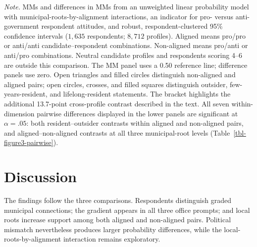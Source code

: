 \documentclass[
  letterpaper,
  DIV=11,
  numbers=noendperiod]{scrartcl}
\newcommand{\criticmarkupadd}[1]{#1}
\newcommand{\criticmarkuprm}[1]{}
\begin{document}
\emph{Note.} MMs and differences in MMs from an unweighted linear
probability model with municipal-roots-by-alignment interactions,
\criticmarkuprm{a}\criticmarkupadd{an indicator for pro- versus
anti-government} respondent \criticmarkuprm{attitude-group
control,}\criticmarkupadd{attitudes,} and robust, respondent-clustered
95\% confidence intervals (\(1{,}635\) respondents; \(8{,}712\)
profiles). Aligned means pro/pro or anti/anti candidate--respondent
combinations. Non-aligned means pro/anti or anti/pro combinations.
Neutral candidate profiles and respondents scoring 4--6 are outside this
comparison. The MM panel uses a 0.50 reference line; difference panels
use zero. Open triangles and filled circles distinguish non-aligned and
aligned pairs; open circles, crosses, and filled squares distinguish
outsider, few-years-resident, and lifelong-resident statements. The
bracket highlights the additional 13.7-point cross-profile contrast
described in the text. All seven within-dimension pairwise differences
displayed in the lower panels are significant at \(\alpha=.05\): both
resident--outsider contrasts within aligned and non-aligned pairs, and
aligned--non-aligned contrasts at all three municipal-root levels
(Table~\ref{tbl-figure3-pairwise}).

\section{Discussion}\label{discussion}

The \criticmarkuprm{results support one
argument:}\criticmarkupadd{findings follow the three comparisons.
Respondents distinguish graded municipal connections; the gradient
appears in all three office prompts; and} local roots
\criticmarkuprm{matter, but they operate within rather than
outside}\criticmarkupadd{increase support among both aligned and
non-aligned pairs. Political mismatch nevertheless produces larger
probability differences, while} the \criticmarkuprm{national political
divide. The few-years-resident statement increases selection by 13.4
points relative to the outsider-with-local-knowledge statement. The
lifelong-resident statement increases selection by 18.6 points relative
to the outsider-with-local-knowledge statement. The alignment comparison
and office split locate these complete statement contrasts within the
national divide and across
offices.}\criticmarkupadd{local-roots-by-alignment interaction remains
exploratory.}
\end{document}
